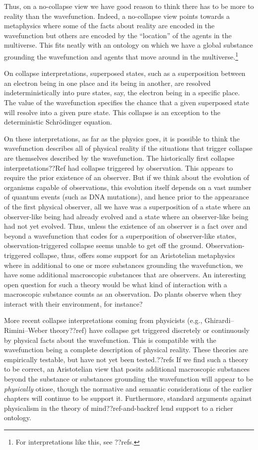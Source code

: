 Thus, on a no-collapse view we have good reason to think there has to be more to reality 
than the wavefunction. Indeed, a no-collapse view points towards a metaphysics where some of the facts about 
reality are encoded in the wavefunction but others are encoded by the ``location'' of the agents in the multiverse.
This fits neatly with an ontology on which we have a global substance grounding the wavefunction and agents that 
move around in the multiverse.\footnote{For interpretations like this, see ??refs.}

On collapse interpretations, superposed states, such as a superposition between an electron being in one place and its 
being in another, are resolved indeterministically into pure states, say, the electron being in a specific place. The 
value of the wavefunction specifies the chance that a given superposed state will resolve into a given pure state. 
This collapse is an exception to the deterministic Schr\"{o}dinger equation.

On these interpretations, as far as the physics goes, it is possible to think the wavefunction describes all of physical 
reality if the situations that trigger collapse are themselves described by the wavefunction. The historically first collapse interpretations??Ref had collapse triggered by observation. This appears to require the prior existence of an observer. But if we think about 
the evolution of organisms capable of observations, this evolution itself depends on a vast number of quantum events (such 
as DNA mutations), and hence prior to the appearance of the first physical observer, all we have was a superposition 
of a state where an observer-like being had already evolved and a state where an observer-like being had not yet evolved. 
Thus, unless the existence of an observer is a fact over and beyond a wavefunction that codes for a superposition of 
observer-like states, observation-triggered collapse seems unable to get off the ground. Observation-triggered collapse,
thus, offers some support for an Aristotelian metaphysics where in additional to one or more substances grounding the 
wavefunction, we have some additional macroscopic substances that are observers. An interesting open question for such a theory 
would be what kind of interaction with a macroscopic substance counts as an observation. Do plants observe when they interact
with their environment, for instance? 

More recent collapse interpretations coming from physicists (e.g., Ghirardi–Rimini–Weber theory??ref) have collapse get triggered discretely or continuously by physical facts about the wavefunction. This is compatible with the wavefunction being a 
complete description of physical reality. These theories are empirically testable, but have not yet been 
tested.??refs If we find such a theory to be correct, an Aristotelian view that posits additional macroscopic substances 
beyond the substance or substances grounding the wavefunction will appear to be \textit{physically} otiose, though the
normative and semantic considerations of the earlier chapters will continue to be support it. Furthermore, standard 
arguments against physicalism in the theory of mind??ref-and-backref lend support to a richer ontology.

